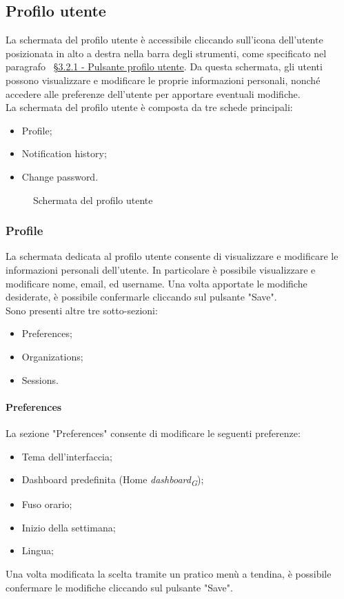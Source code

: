 \subsection{Profilo utente}
La schermata del profilo utente è accessibile cliccando sull'icona dell'utente posizionata in alto a destra nella barra degli strumenti, come specificato nel paragrafo ~\hyperlink{par:pulsante_profilo}{\S3.2.1 - Pulsante profilo utente}. Da questa schermata, gli utenti possono visualizzare e modificare le proprie informazioni personali, nonché accedere alle preferenze dell'utente per apportare eventuali modifiche. \\
La schermata del profilo utente è composta da tre schede principali:
\begin{itemize}
    \item Profile;
    \item Notification history;
    \item Change password.
\end{itemize}
\begin{figure}[H]
    \centering
    \caption{Schermata del profilo utente}
    \label{fig:my_label}
\end{figure}

\subsubsection{Profile}
La schermata dedicata al profilo utente consente di visualizzare e modificare le informazioni personali dell'utente. In particolare è possibile visualizzare e modificare nome, email, ed username. Una volta apportate le modifiche desiderate, è possibile confermarle cliccando sul pulsante "Save". \\
Sono presenti altre tre sotto-sezioni:
\begin{itemize}
    \item Preferences;
    \item Organizations;
    \item Sessions.
\end{itemize}
\paragraph{Preferences}
La sezione "Preferences" consente di modificare le seguenti preferenze:
\begin{itemize}
    \item Tema dell'interfaccia;
    \item Dashboard predefinita (Home \textit{dashboard}\textsubscript{\textit{G}});
    \item Fuso orario;
    \item Inizio della settimana;
    \item Lingua;
\end{itemize}
Una volta modificata la scelta tramite un pratico menù a tendina, è possibile confermare le modifiche cliccando sul pulsante "Save". \\
